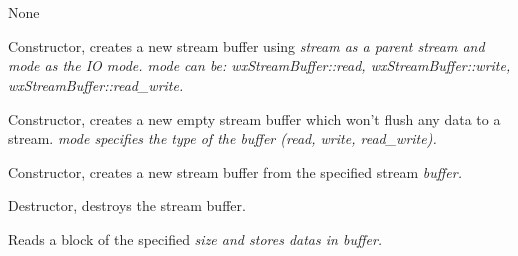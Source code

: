 \section{}\label{wxstreambuffer}


None






Constructor, creates a new stream buffer using \it{stream} as a parent stream
and \it{mode} as the IO mode. \it{mode} can be: wxStreamBuffer::read,
wxStreamBuffer::write, wxStreamBuffer::read\_write.



Constructor, creates a new empty stream buffer which won't flush any data
to a stream. \it{mode} specifies the type of the buffer (read, write, read\_write).



Constructor, creates a new stream buffer from the specified stream \it{buffer}.



Destructor, destroys the stream buffer.

\label{wxstreambufread}


Reads a block of the specified \it{size} and stores datas in \it{buffer}.


